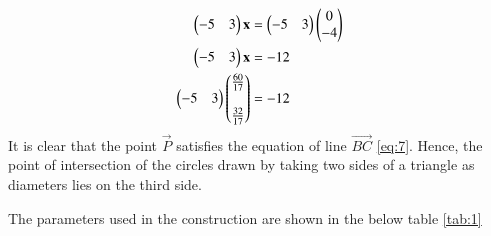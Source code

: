 \documentclass[journal,12pt,twocolumn]{IEEEtran}
\begin{document}
\begin{enumerate}
\begin{align}
\end{align}
\begin{align}
\begin{pmatrix}-5&3\end{pmatrix}\mathbf{x} &= \begin{pmatrix}-5&3\end{pmatrix}\begin{pmatrix}0\\-4\end{pmatrix}\\
\begin{pmatrix}-5&3\end{pmatrix}\mathbf{x} &= -12
\label{eq:7}\\
\begin{pmatrix}-5&3\end{pmatrix}\begin{pmatrix}\frac{60}{17}\\\\\frac{32}{17}\end{pmatrix} &= -12
\end{align}
It is clear that the point $\vec{P}$ satisfies the equation of line $\vec{BC}$ \eqref{eq:7}. Hence, the point of intersection of the circles drawn by taking two sides of a triangle as diameters lies on the third side.

The parameters used in the construction are shown in the below table \ref{tab:1}

\begin{table}[h]
\centering

\caption{}
\label{tab:1}
\end{table}
\end{enumerate}
\end{document}
